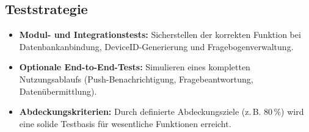 \subsection{Teststrategie}
\begin{itemize}
  \item \textbf{Modul- und Integrationstests:} Sicherstellen der korrekten Funktion bei Datenbankanbindung, DeviceID-Generierung und Fragebogenverwaltung.
  \item \textbf{Optionale End-to-End-Tests:} Simulieren eines kompletten Nutzungsablaufs (Push-Benachrichtigung, Fragebeantwortung, Datenübermittlung).
  \item \textbf{Abdeckungskriterien:} Durch definierte Abdeckungsziele (z.\,B. 80\,\%) wird eine solide Testbasis für wesentliche Funktionen erreicht.
\end{itemize}
